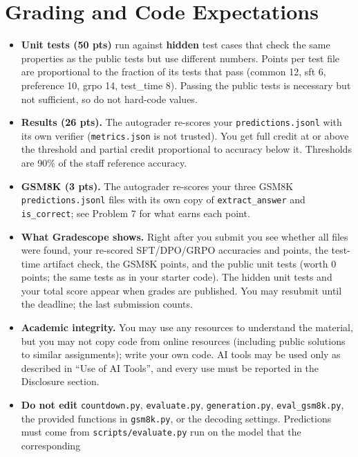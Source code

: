 \documentclass[11pt]{article}
\newcommand{\file}[1]{\texttt{#1}}
\begin{document}
\section*{Grading and Code Expectations}
\begin{itemize}
  \item \textbf{Unit tests (50 pts)} run against \textbf{hidden} test cases that check the same properties as the
        public tests but use different numbers. Points per test file are proportional to the fraction of its
        tests that pass (common 12, sft 6, preference 10, grpo 14, test\_time 8). Passing the public tests is
        necessary but not sufficient, so do not hard-code values.
  \item \textbf{Results (26 pts).} The autograder re-scores your \file{predictions.jsonl} with its own verifier
        (\file{metrics.json} is not trusted). You get full credit at or above the threshold and partial credit
        proportional to accuracy below it. Thresholds are 90\% of the staff reference accuracy.
  \item \textbf{GSM8K (3 pts).} The autograder re-scores your three GSM8K \file{predictions.jsonl} files with its own
        copy of \texttt{extract\_answer} and \texttt{is\_correct}; see Problem 7 for what earns each point.
  \item \textbf{What Gradescope shows.} Right after you submit you see whether all files were found, your
        re-scored SFT/DPO/GRPO accuracies and points, the test-time artifact check, the GSM8K points, and the public unit tests (worth
        0 points; the same tests as in your starter code). The hidden unit tests and your total score appear when
        grades are published. You may resubmit until the deadline; the last submission counts.
  \item \textbf{Academic integrity.} You may use any resources to understand the material, but you may not copy
        code from online resources (including public solutions to similar assignments); write your own code.
        AI tools may be used only as described in ``Use of AI Tools'', and every use must be reported in the
        Disclosure section.
  \item \textbf{Do not edit} \file{countdown.py}, \file{evaluate.py}, \file{generation.py},
        \file{eval\_gsm8k.py}, the provided functions in \file{gsm8k.py}, or the decoding settings. Predictions must come from \file{scripts/evaluate.py} run on the model that the corresponding

\end{itemize}
\end{document}

